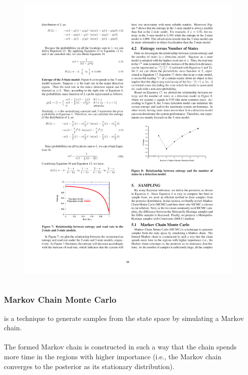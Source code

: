 \begin{frame}
\begin{columns}[c]
\begin{figure}[tb]
  \includegraphics[width=\columnwidth]{figures/3-1/3-1-9.pdf}
  \caption{}
\end{figure}

\end{columns}

\end{frame}


\begin{frame}
\frametitle{Markov Chain Monte Carlo}

 is a technique to generate samples from the state space by simulating a Markov chain.\\~\\

The formed Markov chain is constructed in such a way that the chain spends more time in the regions with higher importance (i.e., the Markov chain converges to the posterior as its stationary distribution).

\end{frame}

